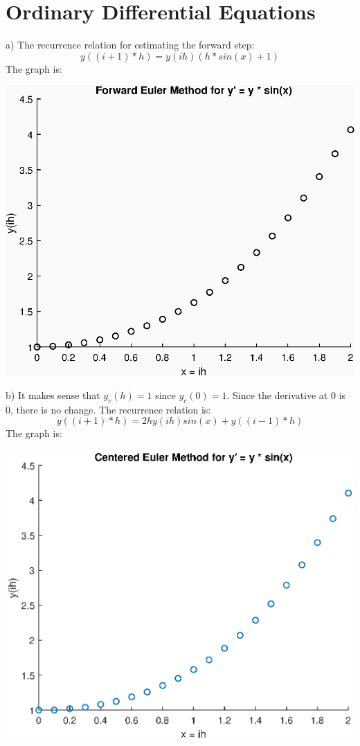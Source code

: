 \documentclass{article}
\begin{document}
\section{Ordinary Differential Equations}
\par
a) The recurrence relation for estimating the forward step: \[y((i+1)*h)=y(ih)(h*sin(x)+1)\]
The graph is:
\begin{center}
    \includegraphics[scale = 0.8]{feuler2a.eps}
\end{center}
\newpage
b) It makes sense that $y_c(h)=1$ since $y_c(0)=1$. Since the derivative at 0 is 0, there is no change. The recurrence relation is: \[y((i+1)*h)=2hy(ih)sin(x)+y((i-1)*h)\]
The graph is:
\begin{center}
    \includegraphics[scale = 0.8]{center2b.eps}
\end{center}
\newpage
\end{document}
